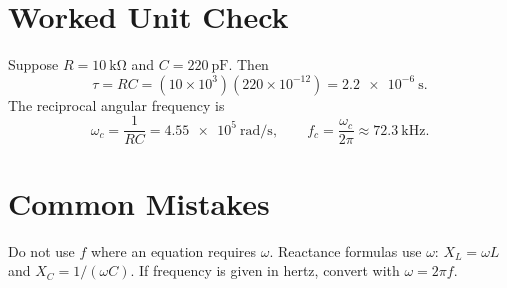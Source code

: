 \section{Worked Unit Check}
Suppose \(R=\SI{10}{\kilo\ohm}\) and \(C=\SI{220}{\pico\farad}\). Then
\[
\tau=RC=(10\times10^3)(220\times10^{-12})=\SI{2.2e-6}{\second}.
\]
The reciprocal angular frequency is
\[
\omega_c=\frac{1}{RC}=\SI{4.55e5}{\radian\per\second},
\qquad
f_c=\frac{\omega_c}{2\pi}\approx \SI{72.3}{\kilo\hertz}.
\]

\section{Common Mistakes}
\begin{mistakebox}
Do not use \(f\) where an equation requires \(\omega\). Reactance formulas use
\(\omega\): \(X_L=\omega L\) and \(X_C=1/(\omega C)\). If frequency is given in
hertz, convert with \(\omega=2\pi f\).
\end{mistakebox}
